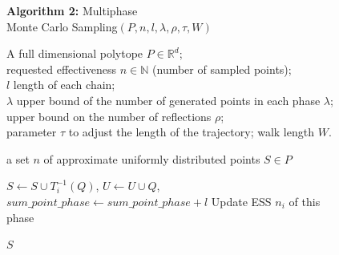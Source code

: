    \begin{figure}
      \label{alg:MMCS}
      \centering
      \textbf{Algorithm 2:} Multiphase \\ Monte Carlo Sampling$(P, n, l, \lambda, \rho, \tau, W)$
      \medskip
      \begin{algorithmic}

      \REQUIRE
      A full dimensional polytope $P\in\mathbb{R}^d$; \\
      requested effectiveness $n\in\mathbb{N}$ (number of sampled points); \\
      $l$ length of each chain;\\ $\lambda$ upper bound of the number of generated points in each phase $\lambda$;  \\
      upper bound on the number of reflections $\rho$;\\
      parameter $\tau$ to adjust the length of the  trajectory; walk length $W$.

      \item[]
      
      \ENSURE
      a set $n$ of approximate uniformly distributed points $S\in P$

      \item[]



      
         

            \ENDFOR
            

            $S\leftarrow S\cup T_i^{-1}(Q)$,\;
            $U\leftarrow U\cup Q$,\;
            $sum\_point\_phase\leftarrow sum\_point\_phase + l$\;
            Update ESS $n_i$ of this phase\;
            \ENDIF

         \ENDWHILE

         
      \ENDWHILE
   
      \RETURN $S$
      \end{algorithmic}
   \end{figure}



